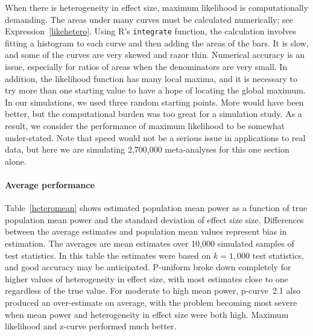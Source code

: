 \documentclass[jou]{apa6} %
\begin{document}
When there is heterogeneity in effect size, maximum likelihood is computationally demanding. The areas under many curves must be calculated numerically; see Expression~\ref{likehetero}. Using R's \texttt{integrate} function, the calculation involves fitting a histogram to each curve and then adding the areas of the bars. It is slow, and some of the curves are very skewed and razor thin. Numerical accuracy is an issue, especially for ratios of areas when the denominators are very small. In addition, the likelihood function has many local maxima, and it is necessary to try more than one starting value to have a hope of locating the global maximum. In our simulations, we used three random starting points. More would have been better, but the computational burden was too great for a simulation study. As a result, we consider the performance of maximum likelihood to be somewhat under-stated. Note that speed would not be a serious issue in applications to real data, but here we are simulating 2,700,000 meta-analyses for this one section alone. 


\paragraph{Average performance} Table~\ref{heteromean} shows estimated population mean power as a function of true population mean power and the standard deviation of effect size size. Differences between the average estimates and population mean values represent bias in estimation. The averages are mean estimates over 10,000 simulated samples of test statistics. In this table the estimates were based on $k=1,000$ test statistics, and good accuracy may be anticipated. P-uniform broke down completely for higher values of heterogeneity in effect size, with most estimates close to one regardless of the true value.  For moderate to high mean power,  p-curve~2.1 also produced an over-estimate on average, with the problem becoming most severe when mean power and heterogeneity in effect size were both high. Maximum likelihood and z-curve performed much better. 
\end{document}
